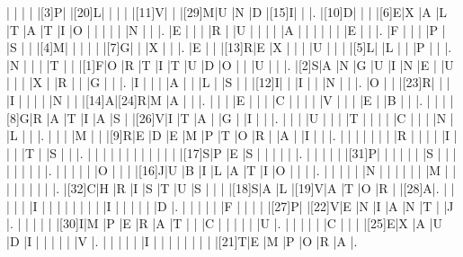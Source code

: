 \documentclass[12pt]{article}
\begin{document}
\begin{Puzzle}{22}{25}
  |{}  |{}  |{}  |{}  |[3]P|{}  |[20]L|{}  |{}  |{}  |{}  |[11]V|{}  |{}  |[29]M|U   |N   |D   |[15]I|{}  |{}  |.
  |[10]D|{}  |{}  |{}  |[6]E|X   |A   |L   |T   |A   |T   |I   |O   |{}  |{}  |{}  |{}  |{}  |N   |{}  |{}  |.
  |E   |{}  |{}  |{}  |R   |{}  |U   |{}  |{}  |{}  |{}  |A   |{}  |{}  |{}  |{}  |{}  |{}  |E   |{}  |{}  |.
  |F   |{}  |{}  |{}  |P   |{}  |S   |{}  |{}  |[4]M|{}  |{}  |{}  |{}  |{}  |[7]G|{}  |{}  |X   |{}  |{}  |.
  |E   |{}  |{}  |[13]R|E   |X   |{}  |{}  |{}  |U   |{}  |{}  |{}  |[5]L|{}  |L   |{}  |{}  |P   |{}  |{}  |.
  |N   |{}  |{}  |{}  |T   |{}  |{}  |[1]F|O   |R   |T   |I   |T   |U   |D   |O   |{}  |{}  |U   |{}  |{}  |.
  |[2]S|A   |N   |G   |U   |I   |N   |E   |{}  |U   |{}  |{}  |{}  |X   |{}  |R   |{}  |{}  |G   |{}  |{}  |.
  |I   |{}  |{}  |{}  |A   |{}  |{}  |L   |{}  |S   |{}  |{}  |[12]I|{}  |{}  |I   |{}  |{}  |N   |{}  |{}  |.
  |O   |{}  |{}  |[23]R|{}  |{}  |{}  |I   |{}  |{}  |{}  |{}  |N   |{}  |{}  |[14]A|[24]R|M   |A   |{}  |{}  |.
  |{}  |{}  |{}  |E   |{}  |{}  |{}  |C   |{}  |{}  |{}  |{}  |V   |{}  |{}  |{}  |E   |{}  |B   |{}  |{}  |.
  |{}  |{}  |{}  |[8]G|R   |A   |T   |I   |A   |S   |{}  |[26]V|I   |T   |A   |{}  |G   |{}  |I   |{}  |{}  |.
  |{}  |{}  |{}  |U   |{}  |{}  |{}  |T   |{}  |{}  |{}  |{}  |C   |{}  |{}  |{}  |N   |{}  |L   |{}  |{}  |.
  |{}  |{}  |{}  |M   |{}  |{}  |[9]R|E   |D   |E   |M   |P   |T   |O   |R   |{}  |A   |{}  |I   |{}  |{}  |.
  |{}  |{}  |{}  |{}  |{}  |{}  |{}  |R   |{}  |{}  |{}  |{}  |I   |{}  |{}  |{}  |T   |{}  |S   |{}  |{}  |.
  |{}  |{}  |{}  |{}  |{}  |{}  |{}  |{}  |{}  |{}  |{}  |{}  |[17]S|P   |E   |S   |{}  |{}  |{}  |{}  |{}  |.
  |{}  |{}  |{}  |{}  |{}  |[31]P|{}  |{}  |{}  |{}  |{}  |{}  |S   |{}  |{}  |{}  |{}  |{}  |{}  |{}  |{}  |.
  |{}  |{}  |{}  |{}  |{}  |O   |{}  |{}  |{}  |[16]J|U   |B   |I   |L   |A   |T   |I   |O   |{}  |{}  |{}  |.
  |{}  |{}  |{}  |{}  |{}  |N   |{}  |{}  |{}  |{}  |{}  |{}  |M   |{}  |{}  |{}  |{}  |{}  |{}  |{}  |{}  |.
  |[32]C|H   |R   |I   |S   |T   |U   |S   |{}  |{}  |{}  |[18]S|A   |L   |[19]V|A   |T   |O   |R   |{}  |[28]A|.
  |{}  |{}  |{}  |{}  |{}  |I   |{}  |{}  |{}  |{}  |{}  |{}  |{}  |{}  |I   |{}  |{}  |{}  |{}  |{}  |D   |.
  |{}  |{}  |{}  |{}  |{}  |F   |{}  |{}  |{}  |{}  |[27]P|{}  |[22]V|E   |N   |I   |A   |N   |T   |{}  |J   |.
  |{}  |{}  |{}  |{}  |{}  |[30]I|M   |P   |E   |R   |A   |T   |{}  |{}  |C   |{}  |{}  |{}  |{}  |{}  |U   |.
  |{}  |{}  |{}  |{}  |{}  |C   |{}  |{}  |{}  |[25]E|X   |A   |U   |D   |I   |{}  |{}  |{}  |{}  |{}  |V   |.
  |{}  |{}  |{}  |{}  |{}  |I   |{}  |{}  |{}  |{}  |{}  |{}  |{}  |{}  |[21]T|E   |M   |P   |O   |R   |A   |.
\end{Puzzle}
\end{document}

